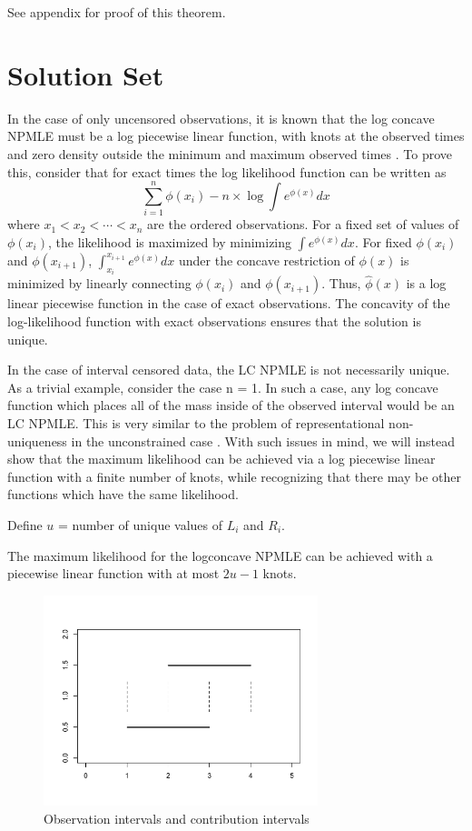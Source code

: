 	See appendix for proof of this theorem. 	


{\section{Solution Set}}
\label{sec:2}

	In the case of only uncensored observations, it is known that the log concave NPMLE must be a log piecewise linear function, with knots at the observed times and zero density outside the minimum and maximum observed times \cite{RefRuf2007}. To prove this, consider that for exact times the log likelihood function can be written as	
	\[ \displaystyle \sum_{i = 1}^n \phi(x_i) - n \times \log \int e^{\phi(x)} dx
	\]
where $x_1<x_2<\cdots<x_n$ are the ordered observations. For a fixed set of values of $\phi(x_i)$, the likelihood is maximized by minimizing $\int e^{\phi(x)} dx$. For fixed $\phi(x_i)$ and $\phi(x_{i+1})$, $\int_{x_i}^{x_{i+1}} e^{\phi(x)}dx$ under the concave restriction of $\phi(x)$ is minimized by linearly connecting $\phi(x_i)$ and $\phi(x_{i+1})$. Thus, $\hat \phi(x)$ is a log linear piecewise function in the case of exact observations. The concavity of the log-likelihood function with exact observations ensures that the solution is unique.
		
	In the case of interval censored data, the LC NPMLE is not necessarily unique. As a trivial example, consider the case n = 1. In such a case, any log concave function which places all of the mass inside of the observed interval would be an LC NPMLE. This is very similar to the problem of representational non-uniqueness in the unconstrained case \cite{RefGV2002}. With such issues in mind, we will instead show that the maximum likelihood can be achieved via a log piecewise linear function with a finite number of knots, while recognizing that there may be other functions which have the same likelihood. 
	
	Define $u$ = number of unique values of $L_i$ and $R_i$. 

	\vspace{3mm}

	\begin{thm}
	\label{thm1}
	The maximum likelihood for the logconcave NPMLE can be achieved with a piecewise linear function with at most $2u-1$ knots.
	\end{thm}
	
\begin{figure}[h]
\centerline{\includegraphics[width = 8cm]{ContrbInt.pdf} }
\caption{Observation intervals and contribution intervals}
\end{figure}	

